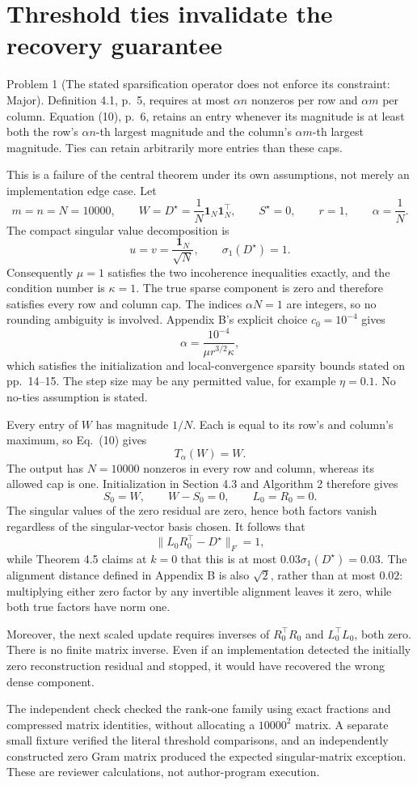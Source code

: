 \documentclass[10pt]{article}
\begin{document}
\section*{Threshold ties invalidate the recovery guarantee}
Problem 1 (The stated sparsification operator does not enforce its constraint: Major).  Definition 4.1, p. 5, requires at most \(\alpha n\) nonzeros per row and \(\alpha m\) per column. Equation (10), p. 6, retains an entry whenever its magnitude is at least both the row’s \(\alpha n\)-th largest magnitude and the column’s \(\alpha m\)-th largest magnitude. Ties can retain arbitrarily more entries than these caps.\par
This is a failure of the central theorem under its own assumptions, not merely an implementation edge case. Let \[m=n=N=10000,\qquad
W=D^\star=\frac1N\mathbf1_N\mathbf1_N^\top,\qquad
S^\star=0,\qquad r=1,\qquad\alpha=\frac1N.\] The compact singular value decomposition is \[u=v=\frac{\mathbf1_N}{\sqrt N},\qquad \sigma_1(D^\star)=1.\] Consequently \(\mu=1\) satisfies the two incoherence inequalities exactly, and the condition number is \(\kappa=1\). The true sparse component is zero and therefore satisfies every row and column cap. The indices \(\alpha N=1\) are integers, so no rounding ambiguity is involved. Appendix B’s explicit choice \(c_0=10^{-4}\) gives \[\alpha=\frac{10^{-4}}{\mu r^{3/2}\kappa},\] which satisfies the initialization and local-convergence sparsity bounds stated on pp. 14–15. The step size may be any permitted value, for example \(\eta=0.1\). No no-ties assumption is stated.\par
Every entry of \(W\) has magnitude \(1/N\). Each is equal to its row’s and column’s maximum, so Eq. (10) gives \[T_\alpha(W)=W.\] The output has \(N=10000\) nonzeros in every row and column, whereas its allowed cap is one. Initialization in Section 4.3 and Algorithm 2 therefore gives \[S_0=W,\qquad W-S_0=0,\qquad L_0=R_0=0.\] The singular values of the zero residual are zero, hence both factors vanish regardless of the singular-vector basis chosen. It follows that \[\|L_0R_0^\top-D^\star\|_F=1,\] while Theorem 4.5 claims at \(k=0\) that this is at most \(0.03\sigma_1(D^\star)=0.03\). The alignment distance defined in Appendix B is also \(\sqrt2\), rather than at most \(0.02\): multiplying either zero factor by any invertible alignment leaves it zero, while both true factors have norm one.\par
Moreover, the next scaled update requires inverses of \(R_0^\top R_0\) and \(L_0^\top L_0\), both zero. There is no finite matrix inverse. Even if an implementation detected the initially zero reconstruction residual and stopped, it would have recovered the wrong dense component.\par
The independent check checked the rank-one family using exact fractions and compressed matrix identities, without allocating a \(10000^2\) matrix. A separate small fixture verified the literal threshold comparisons, and an independently constructed zero Gram matrix produced the expected singular-matrix exception. These are reviewer calculations, not author-program execution.\par
\end{document}
